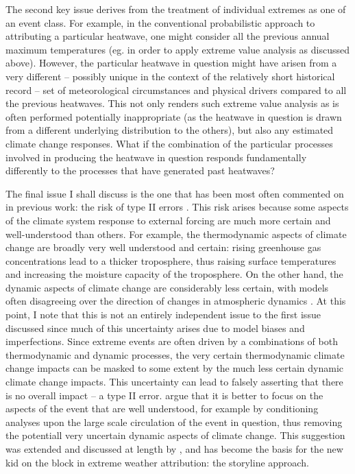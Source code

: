     The second key issue derives from the treatment of individual extremes as one of an event class. For example, in the conventional probabilistic approach to attributing a particular heatwave, one might consider all the previous annual maximum temperatures (eg. in order to apply extreme value analysis as discussed above). However, the particular heatwave in question might have arisen from a very different -- possibly unique in the context of the relatively short historical record -- set of meteorological circumstances and physical drivers compared to all the previous heatwaves. This not only renders such extreme value analysis as is often performed potentially inappropriate (as the heatwave in question is drawn from a different underlying distribution to the others), but also any estimated climate change responses. What if the combination of the particular processes involved in producing the heatwave in question responds fundamentally differently to the processes that have generated past heatwaves?
    
    The final issue I shall discuss is the one that has been most often commented on in previous work: the risk of type II errors \citep{shepherd_common_2016,trenberth_attribution_2015}. This risk arises because some aspects of the climate system response to external forcing are much more certain and well-understood than others. For example, the thermodynamic aspects of climate change are broadly very well understood and certain: rising greenhouse gas concentrations lead to a thicker troposphere, thus raising surface temperatures and increasing the moisture capacity of the troposphere. On the other hand, the dynamic aspects of climate change are considerably less certain, with models often disagreeing over the direction of changes in atmospheric dynamics \citep{masato_winter_2013}. At this point, I note that this is not an entirely independent issue to the first issue discussed since much of this uncertainty arises due to model biases and imperfections. Since extreme events are often driven by a combinations of both thermodynamic and dynamic processes, the very certain thermodynamic climate change impacts can be masked to some extent by the much less certain dynamic climate change impacts. This uncertainty can lead to falsely asserting that there is no overall impact -- a type II error. \citet{trenberth_attribution_2015} argue that it is better to focus on the aspects of the event that are well understood, for example by conditioning analyses upon the large scale circulation of the event in question, thus removing the potentiall very uncertain dynamic aspects of climate change. This suggestion was extended and discussed at length by \citet{shepherd_common_2016}, and has become the basis for the new kid on the block in extreme weather attribution: the storyline approach.

